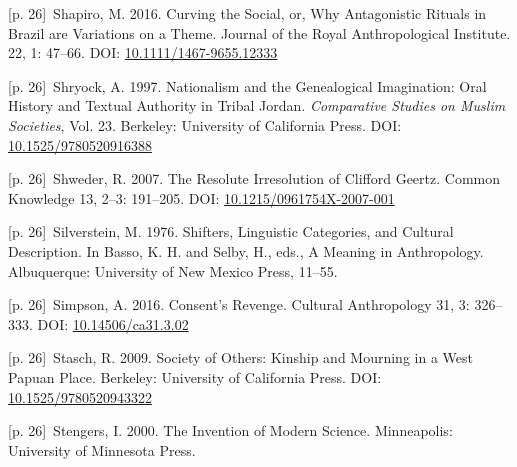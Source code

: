 \documentclass[10pt,a4paper]{article}
\begin{document}
\noindent\begin{minipage}[t]{\linewidth}{\scriptsize\color{gray} [p. 26]}\ Shapiro, M. 2016. Curving the Social, or, Why Antagonistic Rituals in Brazil are Variations on a Theme. Journal of the Royal Anthropological Institute. 22, 1: 47–66. DOI: \url{10.1111/1467-9655.12333}\par\end{minipage}\par
\noindent\begin{minipage}[t]{\linewidth}{\scriptsize\color{gray} [p. 26]}\ Shryock, A. 1997. Nationalism and the Genealogical Imagination: Oral History and Textual Authority in Tribal Jordan. \textit{Comparative Studies on Muslim Societies}, Vol. 23. Berkeley: University of California Press. DOI: \url{10.1525/9780520916388}\par\end{minipage}\par
\noindent\begin{minipage}[t]{\linewidth}{\scriptsize\color{gray} [p. 26]}\ Shweder, R. 2007. The Resolute Irresolution of Clifford Geertz. Common Knowledge 13, 2–3: 191–205. DOI: \url{10.1215/0961754X-2007-001}\par\end{minipage}\par
\noindent\begin{minipage}[t]{\linewidth}{\scriptsize\color{gray} [p. 26]}\ Silverstein, M. 1976. Shifters, Linguistic Categories, and Cultural Description. In Basso, K. H. and Selby, H., eds., A Meaning in Anthropology. Albuquerque: University of New Mexico Press, 11–55.\par\end{minipage}\par
\noindent\begin{minipage}[t]{\linewidth}{\scriptsize\color{gray} [p. 26]}\ Simpson, A. 2016. Consent’s Revenge. Cultural Anthropology 31, 3: 326–333. DOI: \url{10.14506/ca31.3.02}\par\end{minipage}\par
\noindent\begin{minipage}[t]{\linewidth}{\scriptsize\color{gray} [p. 26]}\ Stasch, R. 2009. Society of Others: Kinship and Mourning in a West Papuan Place. Berkeley: University of California Press. DOI: \url{10.1525/9780520943322}\par\end{minipage}\par
\noindent\begin{minipage}[t]{\linewidth}{\scriptsize\color{gray} [p. 26]}\ Stengers, I. 2000. The Invention of Modern Science. Minneapolis: University of Minnesota Press.\par\end{minipage}\par
\end{document}
